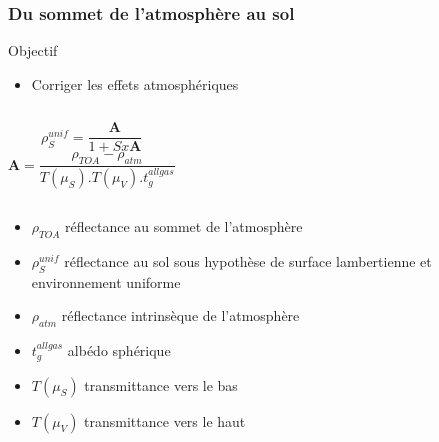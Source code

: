 \documentclass[compress,handout]{beamer}
\begin{document}
\begin{frame}

  \frametitle{Du sommet de l'atmosphère au sol}

  \begin{block}{Objectif}
   \begin{itemize}
    \item Corriger les effets atmosphériques
   \end{itemize}
  \end{block}
 
  
  \begin{columns}
  \footnotesize
  \begin{equation*}
   \rho_{S}^{unif} = \frac{ \mathbf{A} }{ 1 + Sx\mathbf{A} }
  \end{equation*}
  \begin{equation*}
   \mathbf{A} = \frac{ \rho_{TOA} - \rho_{atm} }{ T(\mu_{S}).T(\mu_{V}).t_{g}^{all gas} }
  \end{equation*}
  \end{columns}
  \begin{itemize}
  \item $\rho_{TOA}$ réflectance au sommet de l'atmosphère
  \item $\rho_{S}^{unif}$ réflectance au sol sous hypothèse de surface
    lambertienne et environnement uniforme
  \item $\rho_{atm}$ réflectance intrinsèque de l'atmosphère
  \item $t_{g}^{all gas}$ albédo sphérique
  \item $T(\mu_{S})$ transmittance vers le bas
  \item $T(\mu_{V})$ transmittance vers le haut
  \end{itemize}
\end{frame}
\end{document}
